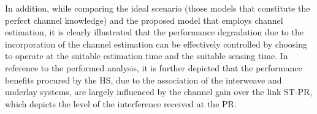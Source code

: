 In addition, while comparing the ideal scenario (those models that constitute the perfect channel knowledge) and the proposed model that employs channel estimation, it is clearly illustrated that the performance degradation due to the incorporation of the channel estimation can be effectively controlled by choosing to operate at the suitable estimation time and the suitable sensing time. 
In reference to the performed analysis, it is further depicted that the performance benefits procured by the HS, due to the association of the interweave and underlay systems, are largely influenced by the channel gain over the link ST-PR, which depicts the level of the interference received at the PR. 

